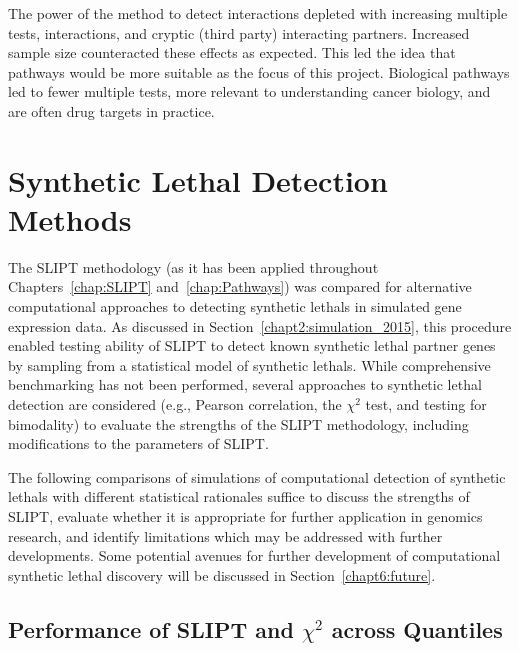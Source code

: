 The power of the method to detect interactions depleted with increasing multiple tests, interactions, and cryptic (third party) interacting partners. Increased sample size counteracted these effects as expected. This led the idea that pathways would be more suitable as the focus of this project. Biological pathways led to fewer multiple tests, more relevant to understanding cancer biology, and are often drug targets in practice.
\fi

\section{Synthetic Lethal Detection Methods} \label{chapt5:compare_methods}

The \gls{SLIPT} methodology (as it has been applied throughout Chapters~\ref{chap:SLIPT} and~\ref{chap:Pathways}) was compared for alternative computational approaches to detecting \glspl{synthetic lethal} in simulated \gls{gene expression} data. As discussed in Section~\ref{chapt2:simulation_2015}, this procedure enabled testing ability of \gls{SLIPT} to detect known \gls{synthetic lethal} partner genes by sampling from a statistical model of \glspl{synthetic lethal}. While comprehensive benchmarking has not been performed, several approaches to \gls{synthetic lethal} detection are considered (e.g., Pearson correlation, the $\chi^2$ test, and testing for bimodality) to evaluate the strengths of the \gls{SLIPT} methodology, including modifications to the parameters of \gls{SLIPT}.

The following comparisons of simulations of computational detection of \glspl{synthetic lethal} with different statistical rationales suffice to discuss the strengths of \gls{SLIPT}, evaluate whether it is appropriate for further application in \glspl{genomic} research, and identify limitations which may be addressed with further developments. Some potential avenues for further development of computational \gls{synthetic lethal} discovery will be discussed in Section~\ref{chapt6:future}.

\subsection{Performance of SLIPT and $\chi^2$ across Quantiles}
\label{chapt5:compare_chisq}

